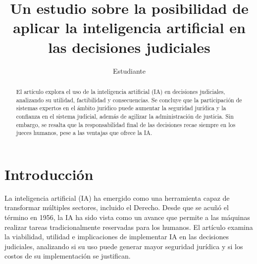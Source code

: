 \documentclass[runningheads]{llncs}
\begin{document}
%
\title{Un estudio sobre la posibilidad de
aplicar la inteligencia artificial en
las decisiones judiciales}

%
\author{Estudiante }
%
%
%
\maketitle 
\begin{abstract}
El artículo explora el uso de la inteligencia artificial (IA) en decisiones judiciales, analizando su utilidad, factibilidad y consecuencias. Se concluye que la participación de sistemas expertos en el ámbito jurídico puede aumentar la seguridad jurídica y la confianza en el sistema judicial, además de agilizar la administración de justicia. Sin embargo, se resalta que la responsabilidad final de las decisiones recae siempre en los jueces humanos, pese a las ventajas que ofrece la IA.
\end{abstract}
%
\section{Introducción}
La inteligencia artificial (IA) ha emergido como una herramienta capaz de transformar múltiples sectores, incluido el Derecho. Desde que se acuñó el término en 1956, la IA ha sido vista como un avance que permite a las máquinas realizar tareas tradicionalmente reservadas para los humanos. El artículo examina la viabilidad, utilidad e implicaciones de implementar IA en las decisiones judiciales, analizando si su uso puede generar mayor seguridad jurídica y si los costos de su implementación se justifican.
\end{document}
